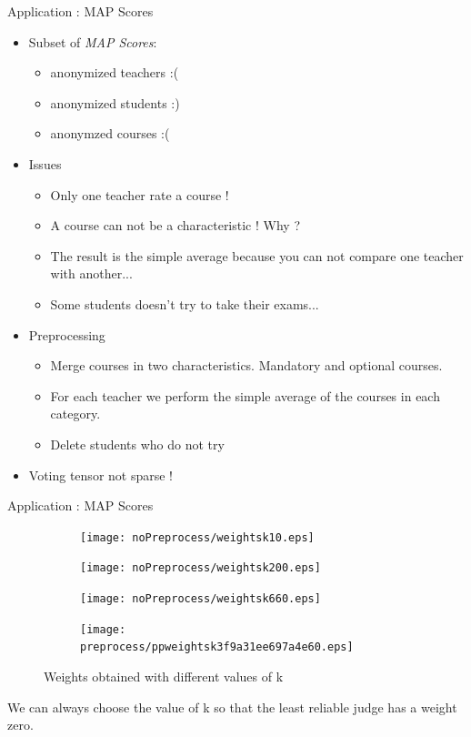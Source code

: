 \begin{frame}{Application : MAP Scores}
\begin{itemize}
    \item Subset of \textit{MAP Scores}:
    \begin{itemize}
        \item {} anonymized teachers :(
        \item {} anonymized students :)
        \item {} anonymzed courses :(
    \end{itemize}
    \item Issues
    \begin{itemize}
        \item Only one teacher rate a course !
        \item A course can not be a characteristic ! Why ?
        \item The result is the simple average because you can not compare one teacher with another...
        \item Some students doesn't try to take their exams...
    \end{itemize}
    \item Preprocessing
        \begin{itemize}
            \item Merge courses in two characteristics. Mandatory and optional courses.
            \item For each teacher we perform the simple average of the courses in each category.
            \item Delete students who do not try
        \end{itemize}
    \item Voting tensor not sparse !
\end{itemize}
\end{frame}

\begin{frame}{Application : MAP Scores}
\begin{figure}[h!]
\centering
\begin{subfigure}[b]{0.24\textwidth}
    \centering
    \texttt{[image: noPreprocess/weightsk10.eps]}
\end{subfigure}
\begin{subfigure}[b]{0.24\textwidth}
    \centering
    \texttt{[image: noPreprocess/weightsk200.eps]}
\end{subfigure}
\begin{subfigure}[b]{0.24\textwidth}
    \centering
    \texttt{[image: noPreprocess/weightsk660.eps]}
\end{subfigure}
\begin{subfigure}[b]{0.24\textwidth}
\centering
\texttt{[image: preprocess/ppweightsk3f9a31ee697a4e60.eps]}
\end{subfigure}
\caption{Weights obtained with different values of k}
\end{figure}
We can always choose the value of k so that the least reliable judge has a weight zero.

\end{frame}

